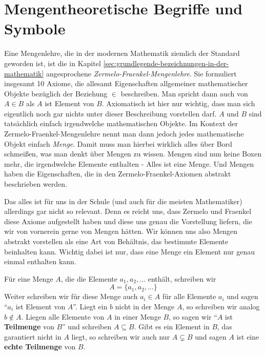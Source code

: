 \begin{definition} %
    
\end{definition}

\section{Mengentheoretische Begriffe und Symbole}
Eine Mengenlehre, die in der modernen Mathematik ziemlich der Standard geworden ist, ist die in Kapitel \ref{sec:grundlegende-bezeichnungen-in-der-mathematik} angesprochene \textit{Zermelo-Fraenkel-Mengenlehre}. Sie formuliert insgesamt 10 Axiome, die allesamt Eigenschaften allgemeiner mathematischer Objekte bezüglich der Beziehung \(\in\) beschreiben. Man spricht dann auch von \(A \in B\) als \(A\) ist Element von \(B\). Axiomatisch ist hier nur wichtig, dass man sich eigentlich noch gar nichts unter dieser Beschreibung vorstellen darf. \(A\) und \(B\) sind tatsächlich einfach irgendwelche mathematischen Objekte. Im Kontext der Zermelo-Fraenkel-Mengenlehre nennt man dann jedoch jedes mathematische Objekt einfach \textit{Menge}. Damit muss man hierbei wirklich alles über Bord schmeißen, was man denkt über Mengen zu wissen. Mengen sind nun keine Boxen mehr, die irgendwelche Elemente enthalten - Alles ist eine Menge. Und Mengen haben die Eigenschaften, die in den Zermelo-Fraenkel-Axiomen abstrakt beschrieben werden. 

Das alles ist für uns in der Schule (und auch für die meisten Mathematiker) allerdings gar nicht so relevant. Denn es reicht uns, dass Zermelo und Fraenkel diese Axiome aufgestellt haben und diese uns genau die Vorstellung liefern, die wir von vornerein gerne von Mengen hätten. Wir können uns also Mengen abstrakt vorstellen als eine Art von Behältnis, das bestimmte Elemente beinhalten kann. Wichtig dabei ist nur, dass eine Menge ein Element nur genau einmal enthalten kann. 

\begin{definition}
    Für eine Menge \(A\), die die Elemente \(a_1, a_2 , \dots\) enthält, schreiben wir 
    \begin{equation*}
        A = \{a_1, a_2, \dots \}
    \end{equation*}
    Weiter schreiben wir für diese Menge auch \(a_i \in A\) für alle Elemente \(a_i\) und sagen "`\(a_i\) ist Element von \(A\)"'. Liegt ein \(b\) nicht in der Menge \(A\), so schreiben wir analog \(b \notin A\). Liegen alle Elemente von \(A\) in einer Menge \(B\), so sagen wir "`\(A\) ist \textbf{Teilmenge} von \(B\)"' und schreiben \(A \subseteq B\). Gibt es ein Element in \(B\), das garantiert nicht in \(A\) liegt, so schreiben wir auch nur \(A \subsetneq B\) und sagen \(A\) ist eine \textbf{echte Teilmenge} von \(B\). 
\end{definition}

